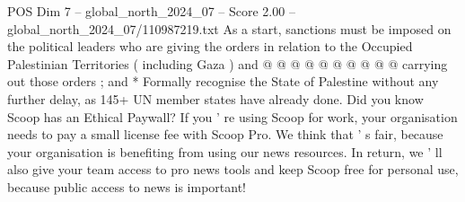 \begin{textsample}{POS Dim 7 – global\_north\_2024\_07 – Score 2.00 – global\_north\_2024\_07/110987219.txt}
As a start, sanctions must be imposed on the political leaders who are giving the orders in relation to the Occupied Palestinian Territories ( including Gaza ) and @ @ @ @ @ @ @ @ @ @ carrying out those orders ; and * Formally recognise the State of Palestine without any further delay, as 145+ UN member states have already done.
Did you know Scoop has an Ethical Paywall?
If you ' re using Scoop for work, your organisation needs to pay a small license fee with Scoop Pro.
We think that ' s fair, because your organisation is benefiting from using our news resources.
In return, we ' ll also give your team access to pro news tools and keep Scoop free for personal use, because public access to news is important!

\end{textsample}

